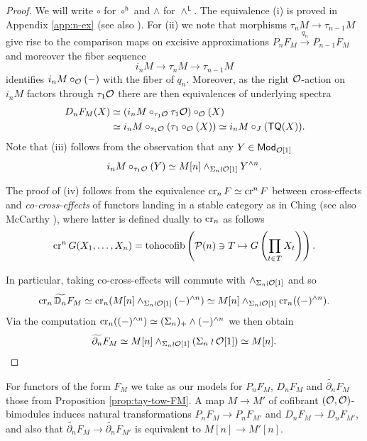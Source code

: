\begin{proof}
We will write $\circ$ for $\circ^{\mathsf{h}}$ and $\wedge$ for $\wedge^{\mathsf{L}}$. The equivalence (i) is proved in Appendix \ref{app:n-ex} (see also \cite[4.3]{Per-thesis}). For (ii) we note that morphisms $\tau_n M \to \tau_{n-1} M$ give rise to the comparison maps on excisive approximations $P_n F_M\xrightarrow{q_n} P_{n-1} F_M$ and moreover the fiber sequence \[ i_n M \to \tau_n M\to \tau_{n-1} M\] identifies $i_n M\circ_{\mathcal{O}} (-)$ with the fiber of $q_n$. Moreover, as the right $\mathcal{O}$-action on $i_n M$ factors through $\tau_1\mathcal{O}$ there are then equivalences of underlying spectra
\begin{align*} 
    D_n F_M(X) &\simeq (i_n M\circ_{\tau_1 \mathcal{O}} \tau_1\mathcal{O}) \circ_{\mathcal{O}}(X) \\
               &\simeq i_n M  \circ_{\tau_1\mathcal{O}} (\tau_1 \circ_{\mathcal{O}}(X)) 
               \simeq i_n M \circ_J (\mathsf{TQ}(X)).
    \end{align*} Note that (iii) follows from the observation that any $Y\in \mathsf{Mod}_{\mathcal{O}[1]}$ \[ 
        i_n M \circ_{\tau_1{\mathcal{O}}} (Y)\simeq M[n] \wedge_{\Sigma_n \wr \mathcal{O}[1]} Y^{\wedge n}. \] 
    
The proof of (iv) follows from the equivalence $\operatorname{cr}_n F\simeq\operatorname{cr}^nF$ between cross-effects and \textit{co-cross-effects} of functors landing in a stable category as in Ching \cite{Ching-chain-rule} (see also McCarthy \cite{McC-dual}), where latter is defined dually to $\operatorname{cr}_n$ as follows \[\operatorname{cr}^n G(X_1,\dots,X_n)=\operatorname{tohocofib}\left(\mathcal{P}(n)\ni T\mapsto G\left( \prod_{t\in T} X_t\right) \right).\]

In particular, taking co-cross-effects will commute with $\wedge_{\Sigma_n \wr \mathcal{O}[1]}$ and so 
    \[ \operatorname{cr}_n \widetilde{\mathbb{D}_n} F_M \simeq \operatorname{cr}_n (M[n]\wedge_{\Sigma_n \wr \mathcal{O}[1]} (-)^{\wedge n})\simeq  M[n]  \wedge_{\Sigma_n \wr \mathcal{O}[1]} \operatorname{cr}_n ((-)^{\wedge n}).\] 
Via the computation $\operatorname{cr}_n ((-)^{\wedge n})\simeq (\Sigma_n)_+ \wedge (-)^{\wedge n}$ we then obtain \[\widetilde{\partial_n}F_M \simeq M[n]\wedge_{\Sigma_n \wr \mathcal{O}[1]} (\Sigma_n \wr \mathcal{O}[1])\simeq M[n].\]
\end{proof}



\begin{definition}
    For functors of the form $F_M$ we take as our models for $P_n F_M$, $D_n F_M$ and $\widetilde{\partial_n} F_M$ those from Proposition \ref{prop:tay-tow-FM}. A map $M\to M'$ of cofibrant $(\mathcal{O}, \mathcal{O})$-bimodules induces natural transformations $P_n F_M \to P_n F_{M'}$ and $D_n F_M\to D_n F_{M'}$, and also that $\widetilde{\partial_n} F_M \to \widetilde{\partial_n} F_{M'}$ is equivalent to $M[n]\to M'[n]$.
\end{definition}

